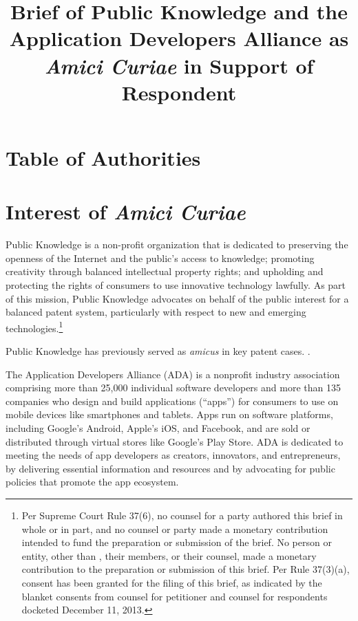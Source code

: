 \documentclass{scotus}
\title{Brief of Public Knowledge and the Application Developers Alliance as
\protect\\\emph{Amici Curiae} in Support of Respondent}
\begin{document}
\maketitle

\romanpagenumbers
\tableofcontents

\part{Table of Authorities}

\tableofauthorities

\clearpage
\arabicpagenumbers

\part{Interest of \emph{Amici Curiae}}

Public Knowledge is a non-profit organization that is dedicated to preserving
the openness of the Internet and the public's access to knowledge; promoting
creativity through balanced intellectual property rights; and upholding and
protecting the rights of consumers to use innovative technology lawfully. As
part of this mission, Public Knowledge advocates on behalf of the public
interest for a balanced patent system, particularly with respect to new and
emerging technologies.\footnote{Per Supreme Court Rule 37(6), no counsel for a
party authored this brief in whole or in part, and no counsel or party made a
monetary contribution intended to fund the preparation or submission of the
brief. No person or entity, other than \amici, their members, or their counsel,
made a monetary contribution to the preparation or submission of this brief. Per
Rule 37(3)(a), consent has been granted for the filing of this brief, as
indicated by the blanket consents from counsel for petitioner and counsel for
respondents docketed December 11, 2013.}

Public Knowledge has previously served as \emph{amicus} in key patent cases.
.

The Application Developers Alliance (ADA) is a nonprofit industry association
comprising more than 25,000 individual software developers and more than 135
companies who design and build applications (“apps”) for consumers to use on
mobile devices like smartphones and tablets. Apps run on software platforms,
including Google’s Android, Apple’s iOS, and Facebook, and are sold or
distributed through virtual stores like Google’s Play Store. ADA is dedicated to
meeting the needs of app developers as creators, innovators, and entrepreneurs,
by delivering essential information and resources and by advocating for public
policies that promote the app ecosystem.
\end{document}
